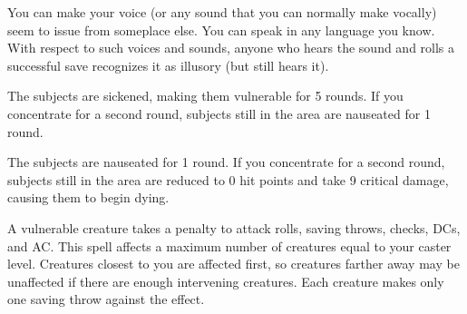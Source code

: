 \spellrng{\rngclose}
\begin{spelleffect}
  You can make your voice (or any sound that you can normally make vocally) seem to issue from someplace else. You can speak in any language you know. With respect to such voices and sounds, anyone who hears the sound and rolls a successful save recognizes it as illusory (but still hears it).
\end{spelleffect}

\begin{comment}
\spellsection{Vestments of the Mage}
\spelldesc{You imbue a set of armor with magical power, preventing it from interfering with your spellcasting.}
\spellschool{Transmutation (Imbuement)}
\spelllvl{Sor/Wiz 2}
\spellrng{Touch}
\spelltgt{Touched nonmagical armor or shield}
\spelldur{\durext (D)}
\spellsave{Will negates (harmless, object)}
\spellsr{Yes (Will)}
\begin{spelleffect}
  The armor or shield's chance of arcane spell failure decreases by 10\% as long as you are wearing or using it. If any other creature wears the armor, it receives no benefit from this spell.
\end{spelleffect}
\begin{spellnotes}
  This is considered an enhancement bonus.
\end{spellnotes}
\end{comment}

\begin{spellhealthy}
  The subjects are sickened, making them vulnerable for 5 rounds. If you concentrate for a second round, subjects still in the area are nauseated for 1 round.
\end{spellhealthy}
\begin{spellblood}
  The subjects are nauseated for 1 round. If you concentrate for a second round, subjects still in the area are reduced to 0 hit points and take 9 critical damage, causing them to begin dying.
\end{spellblood}
\begin{spellnotes}
  A vulnerable creature takes a  penalty to attack rolls, saving throws, checks, DCs, and AC.
  This spell affects a maximum number of creatures equal to your caster level. Creatures closest to you are affected first, so creatures farther away may be unaffected if there are enough intervening creatures. Each creature makes only one saving throw against the effect.
\end{spellnotes}

